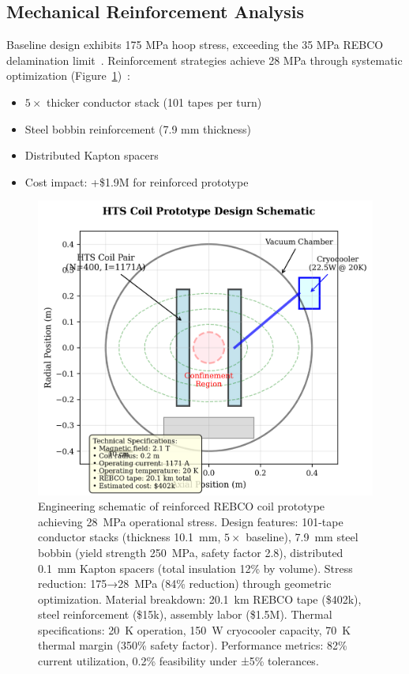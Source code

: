 \documentclass[10pt,twocolumn]{article}
\begin{document}
\subsection{Mechanical Reinforcement Analysis}

Baseline design exhibits 175 MPa hoop stress, exceeding the 35 MPa REBCO delamination limit~\cite{vanderLaan2010mechanical}. Reinforcement strategies achieve 28 MPa through systematic optimization (Figure~\ref{fig:prototype})~\cite{zhou2023}:
\begin{itemize}
\item $5\times$ thicker conductor stack (101 tapes per turn)~\cite{vanderLaan2010mechanical}
\item Steel bobbin reinforcement (7.9 mm thickness)  
\item Distributed Kapton spacers
\item Cost impact: +\$1.9M for reinforced prototype
\end{itemize}

\begin{figure}[ht]
	\centering
	\includegraphics[width=0.9\columnwidth]{figures/prototype.png}
	\caption{Engineering schematic of reinforced REBCO coil prototype achieving 28~MPa operational stress. Design features: 101-tape conductor stacks (thickness 10.1~mm, $5\times$ baseline), 7.9~mm steel bobbin (yield strength 250~MPa, safety factor 2.8), distributed 0.1~mm Kapton spacers (total insulation 12\% by volume). Stress reduction: 175→28~MPa (84\% reduction) through geometric optimization. Material breakdown: 20.1~km REBCO tape (\$402k), steel reinforcement (\$15k), assembly labor (\$1.5M). Thermal specifications: 20~K operation, 150~W cryocooler capacity, 70~K thermal margin (350\% safety factor). Performance metrics: 82\% current utilization, 0.2\% feasibility under ±5\% tolerances.}
	\label{fig:prototype}
\end{figure}
\end{document}
